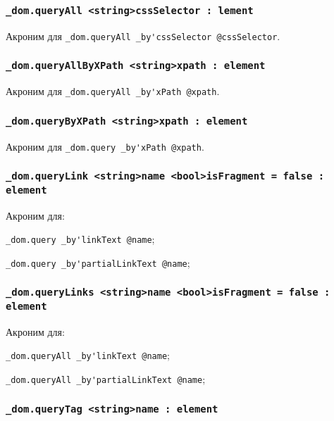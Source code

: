 \subsubsection{\lstinline|_dom.queryAll <string>cssSelector : lement|}

Акроним для \lstinline|_dom.queryAll _by'cssSelector @cssSelector|.

\subsubsection{\lstinline|_dom.queryAllByXPath <string>xpath : element|}

Акроним для \lstinline|_dom.queryAll _by'xPath @xpath|.

\subsubsection{\lstinline|_dom.queryByXPath <string>xpath : element|}

Акроним для \lstinline|_dom.query _by'xPath @xpath|.

\subsubsection{\lstinline|_dom.queryLink <string>name <bool>isFragment = false : element|}

Акроним для:
\begin{icItems}
	\item \lstinline|_dom.query _by'linkText @name|;
	\item \lstinline|_dom.query _by'partialLinkText @name|;
\end{icItems}

\subsubsection{\lstinline|_dom.queryLinks <string>name <bool>isFragment = false : element|}

Акроним для:
\begin{icItems}
	\item \lstinline|_dom.queryAll _by'linkText @name|;
	\item \lstinline|_dom.queryAll _by'partialLinkText @name|;
\end{icItems}

\subsubsection{\lstinline|_dom.queryTag <string>name : element|}

